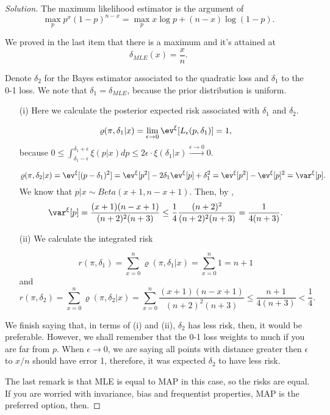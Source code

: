 \begin{proof}[Solution]
    The maximum likelihood estimator is the argument of 
    $$\max_p p^x(1-p)^{n-x} = \max_p x\log p + (n-x)\log (1-p).$$

    We proved in the last item that there is a maximum and it's attained
    at 
    $$
    \delta_{MLE}(x) = \frac{x}{n}.
    $$

    Denote $\delta_2$ for the Bayes estimator associated to the quadratic
    loss and $\delta_1$ to the 0-1 loss. We note that $\delta_1 =
    \delta_{MLE}$, because the prior distribution is uniform. 
    
    \begin{enumerate}
        \item[(i)] Here we calculate the posterior expected risk associated
        with $\delta_1$ and $\delta_2$.  

        $$\varrho(\pi, \delta_1|x) = \lim_{\epsilon \to
        0}\ev^{\xi}[L_{\epsilon}(p, \delta_1)] = 1,$$
        because $0 \le \int_{\delta_1-\epsilon}^{\delta_1+\epsilon}
        \xi(p|x)dp \le 2\epsilon\cdot\xi(\delta_1|x) \overset{\epsilon\to
        0}{\to} 0$.

        $$
        \varrho(\pi, \delta_2|x) = \ev^{\xi}[(p - \delta_1)^2] = \ev^{\xi}[p^2] - 2\delta_1\ev^{\xi}[p] + \delta_1^2 = \ev^{\xi}[p^2] -\ev^{\xi}[p]^2 = \var^{\xi}[p].
        $$
        We know that $p|x \sim Beta(x+1, n-x+1)$. Then, by \cite{beta-dist},
        $$\var^{\xi}[p] = \frac{(x+1)(n-x+1)}{(n+2)^2(n+3)} \le
        \frac{1}{4}\frac{(n+2)^2}{(n+2)^2(n+3)} = \frac{1}{4(n+3)}.$$

        \item[(ii)] We calculate the integrated risk 
        
        $$
        r(\pi, \delta_1) = \sum_{x=0}^n \varrho(\pi, \delta_1|x)= \sum_{x=0}^n 1 = n + 1
        $$
        and
        $$
        r(\pi, \delta_2) = \sum_{x=0}^n \varrho(\pi, \delta_2|x)= \sum_{x=0}^n \frac{(x+1)(n-x+1)}{(n+2)^2(n+3)} \le \frac{n+1}{4(n+3)} < \frac{1}{4}.
        $$
    \end{enumerate}
    We finish saying that, in terms of (i) and (ii), $\delta_2$ has less risk, then,
    it would be preferable. However, we shall remember that the 0-1 loss weights to
    much if you are far from $p$. When $\epsilon \to 0$, we are saying all
    points with distance greater then $\epsilon$ to $x/n$ should have error 1,
    therefore, it was expected $\delta_2$ to have less risk. 

    The last remark is that MLE is equal to MAP in this case, so the risks
    are equal. If you are worried with invariance, bias and frequentist
    properties, MAP is the preferred option, then. 
\end{proof}
